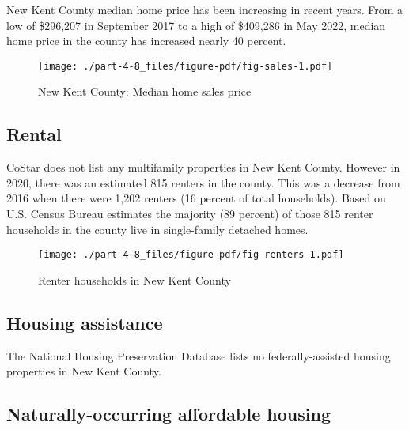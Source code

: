 \documentclass[
  letterpaper,
  DIV=11,
  numbers=noendperiod]{scrreprt}
\begin{document}
New Kent County median home price has been increasing in recent years.
From a low of \$296,207 in September 2017 to a high of \$409,286 in May
2022, median home price in the county has increased nearly 40 percent.

\begin{figure}

{\centering \texttt{[image: ./part-4-8\_files/figure-pdf/fig-sales-1.pdf]}

}

\caption{\label{fig-sales}New Kent County: Median home sales price}

\end{figure}

\hypertarget{rental-7}{%
\subsection{Rental}\label{rental-7}}

CoStar does not list any multifamily properties in New Kent County.
However in 2020, there was an estimated 815 renters in the county. This
was a decrease from 2016 when there were 1,202 renters (16 percent of
total households). Based on U.S. Census Bureau estimates the majority
(89 percent) of those 815 renter households in the county live in
single-family detached homes.

\begin{figure}

{\centering \texttt{[image: ./part-4-8\_files/figure-pdf/fig-renters-1.pdf]}

}

\caption{\label{fig-renters}Renter households in New Kent County}

\end{figure}

\hypertarget{housing-assistance-5}{%
\subsection{Housing assistance}\label{housing-assistance-5}}

The National Housing Preservation Database lists no federally-assisted
housing properties in New Kent County.

\hypertarget{naturally-occurring-affordable-housing-6}{%
\subsection{Naturally-occurring affordable
housing}\label{naturally-occurring-affordable-housing-6}}
\end{document}
